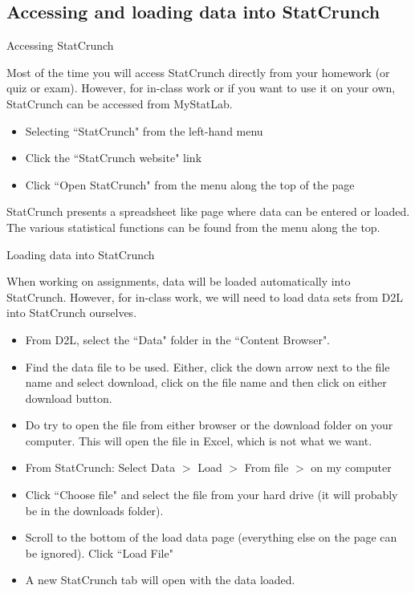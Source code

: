 \documentclass[aspectratio=169]{beamer}
\begin{document}
\subsection{Accessing and loading data into StatCrunch}


\begin{frame}{Accessing StatCrunch}
\begin{block}{}
Most of the time you will access StatCrunch directly from your homework (or quiz or exam). However, for in-class work or if you want to use it on your own, StatCrunch can be accessed from MyStatLab.
\begin{itemize}
\item Selecting ``StatCrunch" from the left-hand menu
\item Click the ``StatCrunch website" link 
\item Click ``Open StatCrunch" from the menu along the top of the page
\end{itemize}
StatCrunch presents a spreadsheet like page where data can be entered or loaded. The various statistical functions can be found from the menu along the top.
\end{block}

\end{frame}

\begin{frame}{Loading data into StatCrunch}
\begin{block}{}
When working on assignments, data will be loaded automatically into StatCrunch. However, for in-class work, we will need to load data sets from D2L into StatCrunch ourselves.
\begin{itemize}
\item From D2L, select the ``Data" folder in the ``Content Browser".
\item Find the data file to be used. Either, click the down arrow next to the file name and select download,  click on the file name and then click on either download button.
\item Do  try to open the file from either browser or the download folder on your computer. This will open the file in Excel, which is not what we want.
\item From StatCrunch: Select Data $>$ Load $>$ From file $>$ on my computer
\item Click ``Choose file" and select the file from your hard drive (it will probably be in the downloads folder). 
\item Scroll to the bottom of the load data page (everything else on the page can be ignored). Click ``Load File"
\item A new StatCrunch tab will open with the data loaded.
\end{itemize}
\end{block}

\end{frame}
\end{document}
